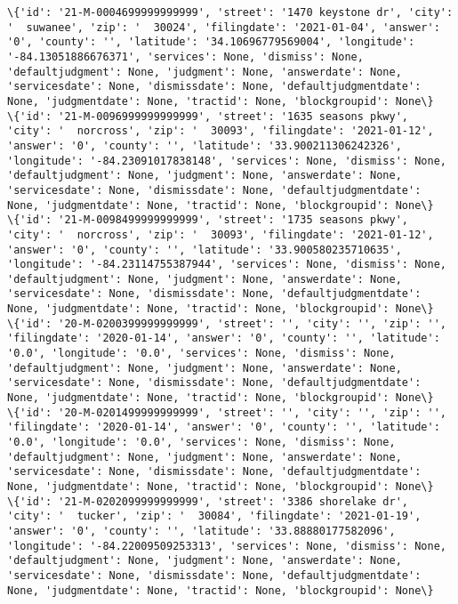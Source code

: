 \documentclass[11pt]{article}
\begin{document}
\begin{Verbatim}[commandchars=\\\{\}]
\{'id': '21-M-0004699999999999', 'street': '1470 keystone dr', 'city': '  suwanee', 'zip': '  30024', 'filingdate': '2021-01-04', 'answer': '0', 'county': '', 'latitude': '34.10696779569004', 'longitude': '-84.13051886676371', 'services': None, 'dismiss': None, 'defaultjudgment': None, 'judgment': None, 'answerdate': None, 'servicesdate': None, 'dismissdate': None, 'defaultjudgmentdate': None, 'judgmentdate': None, 'tractid': None, 'blockgroupid': None\}
\{'id': '21-M-0096999999999999', 'street': '1635 seasons pkwy', 'city': '  norcross', 'zip': '  30093', 'filingdate': '2021-01-12', 'answer': '0', 'county': '', 'latitude': '33.900211306242326', 'longitude': '-84.23091017838148', 'services': None, 'dismiss': None, 'defaultjudgment': None, 'judgment': None, 'answerdate': None, 'servicesdate': None, 'dismissdate': None, 'defaultjudgmentdate': None, 'judgmentdate': None, 'tractid': None, 'blockgroupid': None\}
\{'id': '21-M-0098499999999999', 'street': '1735 seasons pkwy', 'city': '  norcross', 'zip': '  30093', 'filingdate': '2021-01-12', 'answer': '0', 'county': '', 'latitude': '33.900580235710635', 'longitude': '-84.23114755387944', 'services': None, 'dismiss': None, 'defaultjudgment': None, 'judgment': None, 'answerdate': None, 'servicesdate': None, 'dismissdate': None, 'defaultjudgmentdate': None, 'judgmentdate': None, 'tractid': None, 'blockgroupid': None\}
\{'id': '20-M-0200399999999999', 'street': '', 'city': '', 'zip': '', 'filingdate': '2020-01-14', 'answer': '0', 'county': '', 'latitude': '0.0', 'longitude': '0.0', 'services': None, 'dismiss': None, 'defaultjudgment': None, 'judgment': None, 'answerdate': None, 'servicesdate': None, 'dismissdate': None, 'defaultjudgmentdate': None, 'judgmentdate': None, 'tractid': None, 'blockgroupid': None\}
\{'id': '20-M-0201499999999999', 'street': '', 'city': '', 'zip': '', 'filingdate': '2020-01-14', 'answer': '0', 'county': '', 'latitude': '0.0', 'longitude': '0.0', 'services': None, 'dismiss': None, 'defaultjudgment': None, 'judgment': None, 'answerdate': None, 'servicesdate': None, 'dismissdate': None, 'defaultjudgmentdate': None, 'judgmentdate': None, 'tractid': None, 'blockgroupid': None\}
\{'id': '21-M-0202099999999999', 'street': '3386 shorelake dr', 'city': '  tucker', 'zip': '  30084', 'filingdate': '2021-01-19', 'answer': '0', 'county': '', 'latitude': '33.88880177582096', 'longitude': '-84.22009509253313', 'services': None, 'dismiss': None, 'defaultjudgment': None, 'judgment': None, 'answerdate': None, 'servicesdate': None, 'dismissdate': None, 'defaultjudgmentdate': None, 'judgmentdate': None, 'tractid': None, 'blockgroupid': None\}

\end{Verbatim}
\end{document}
